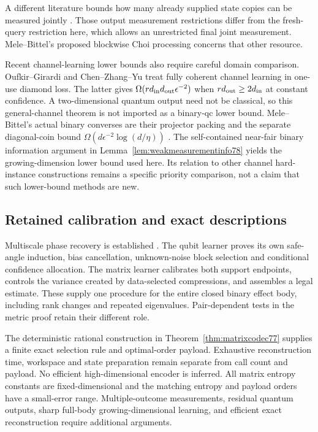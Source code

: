 A different literature bounds how many already supplied state
copies can be measured jointly \cite{CLL78,NZ78}. Those output
measurement restrictions differ from the fresh-query restriction
here, which allows an unrestricted final joint measurement.
Mele--Bittel's proposed blockwise Choi processing
\cite[Section~I.5]{MB67} concerns that other resource.

Recent channel-learning lower bounds also require careful domain
comparison. Oufkir--Girardi \cite{OG67} and Chen--Zhang--Yu
\cite[Theorems~1.1 and~4.2]{CZY78} treat fully coherent channel
learning in one-use diamond loss. The latter gives
$\Omega(rd_{\rm in}d_{\rm out}\epsilon^{-2})$ when
$rd_{\rm out}\ge2d_{\rm in}$ at constant confidence.
A two-dimensional quantum output need not be classical, so this
general-channel theorem is not imported as a binary-qc lower bound.
Mele--Bittel's actual binary converses are their projector packing
\cite[Proposition~IV.17]{MB67} and the separate diagonal-coin bound
$\Omega(d\epsilon^{-2}\log(d/\eta))$
\cite[Corollary~IV.20]{MB67}. The self-contained near-fair binary
information argument in Lemma~\ref{lem:weakmeasurementinfo78}
yields the growing-dimension lower bound used here. Its relation
to other channel hard-instance constructions remains a specific
priority comparison, not a claim that such lower-bound methods
are new.

\subsection{Retained calibration and exact descriptions}
Multiscale phase recovery is established \cite{HB76,KLY76}.
The qubit learner proves its own safe-angle induction, bias
cancellation, unknown-noise block selection and conditional
confidence allocation. The matrix learner calibrates both support
endpoints, controls the variance created by data-selected
compressions, and assembles a legal estimate. These supply one
procedure for the entire closed binary effect body, including
rank changes and repeated eigenvalues. Pair-dependent tests in the
metric proof retain their different role.

The deterministic rational construction in
Theorem~\ref{thm:matrixcodec77} supplies a finite exact selection
rule and optimal-order payload. Exhaustive reconstruction time,
workspace and state preparation remain separate from call count
and payload. No efficient high-dimensional encoder is inferred.
All matrix entropy constants are fixed-dimensional and the
matching entropy and payload orders have a small-error range.
Multiple-outcome measurements, residual quantum outputs, sharp
full-body growing-dimensional learning, and efficient exact
reconstruction require additional arguments.
